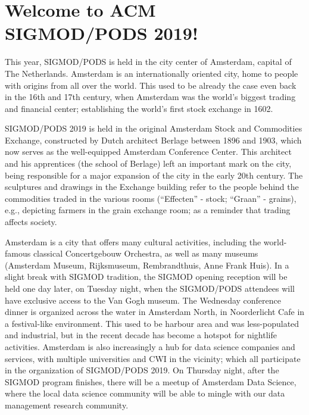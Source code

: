 


\section{Welcome to ACM SIGMOD/PODS 2019!}

This year, SIGMOD/PODS is held in the city center of Amsterdam, capital of The Netherlands. Amsterdam is an internationally oriented city, home to people with origins from all over the world. This used to be already the case even back in the 16th and 17th century, when Amsterdam was the world's biggest trading and financial center; establishing the world's first stock exchange in 1602.

SIGMOD/PODS 2019 is held in the original Amsterdam Stock and Commodities Exchange, constructed by Dutch architect Berlage between 1896 and 1903, which now serves as the well-equipped Amsterdam Conference Center. This architect and his apprentices (the school of Berlage) left an important mark on the city, being responsible for a major expansion of the city in the early 20th century. The sculptures and drawings in the Exchange building refer to the people behind the commodities traded in the various rooms (``Effecten'' - stock; ``Graan'' - grains), e.g., depicting farmers in the grain exchange room; as a reminder that trading affects society.

Amsterdam is a city that offers many cultural activities, including the world-famous classical Concertgebouw Orchestra, as well as many museums (Amsterdam Museum, Rijksmuseum, Rembrandthuis, Anne Frank Huis). In a slight break with SIGMOD tradition, the SIGMOD opening reception will be held one day later, on Tuesday night, when the SIGMOD/PODS attendees will have exclusive access to the Van Gogh museum. The Wednesday conference dinner is organized across the water in Amsterdam North, in Noorderlicht Cafe in a festival-like environment. This used to be harbour area and was less-populated and industrial, but in the recent decade has become a hotspot for nightlife activities. Amsterdam is also increasingly a hub for data science companies and services, with multiple universities and CWI in the vicinity; which all participate in the organization of SIGMOD/PODS 2019. On Thursday night, after the SIGMOD program finishes, there will be a meetup of Amsterdam Data Science, where the local data science community will be able to mingle with our data management research community.

